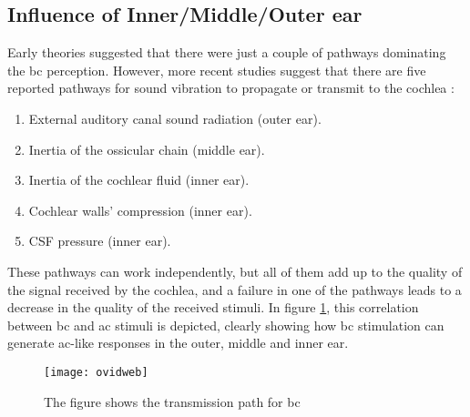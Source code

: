\subsection{Influence of Inner/Middle/Outer ear}

Early theories suggested that there were just a couple of pathways dominating the \gls{bc} perception. However, more recent studies suggest that there are five reported pathways for sound vibration to propagate or transmit to the cochlea \citep{zhang_2016}:
\begin{enumerate}
\item External auditory canal sound radiation (outer ear).
\item Inertia of the ossicular chain (middle ear).
\item Inertia of the cochlear fluid (inner ear).
\item Cochlear walls' compression (inner ear).
\item CSF pressure (inner ear).
\end{enumerate}

These pathways can work independently, but all of them add up to the quality of the signal received by the cochlea, and a failure in one of the pathways leads to a decrease in the quality of the received stimuli. In figure \ref{fig:hearing_system_pathway}, this correlation between \gls{bc} and \gls{ac} stimuli is depicted, clearly showing how \gls{bc} stimulation can generate \gls{ac}-like responses in the outer, middle and inner ear.

 \begin{figure}[H]
	\centering
		\texttt{[image: ovidweb]}
		\caption{The figure shows the transmission path for \gls{bc} \citep{stenfelt_2005}}
		\label{fig:hearing_system_pathway}
\end{figure}


